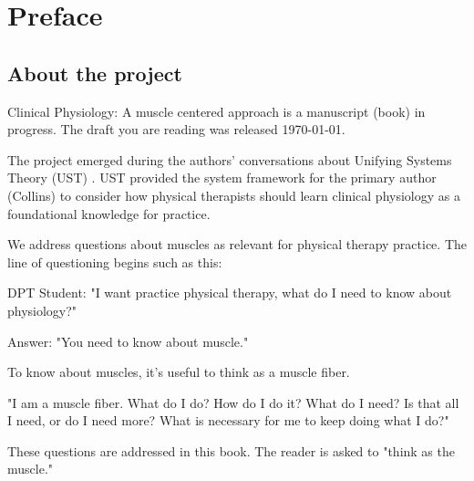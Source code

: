 \chapter*{Preface}

% 
\section*{About the project}
Clinical Physiology: A muscle centered approach is a manuscript (book) in progress. The draft you are reading was released \today.

The project emerged during the authors' conversations about Unifying Systems Theory (UST) \cite{kahlen_perception_2017}. UST provided the system framework for the primary author (Collins) to consider how physical therapists should learn clinical physiology as a foundational knowledge for practice. 

We address questions about muscles as relevant for physical therapy practice. The line of questioning begins such as this: 

\vspace{5mm}

\noindent DPT Student: "I want practice physical therapy, what do I need to know about physiology?" 

\vspace{5mm}

\noindent Answer: "You need to know about muscle." 

\vspace{5mm}

\noindent To know about muscles, it's useful to think as a muscle fiber. 
\vspace{5mm}

\noindent "I am a muscle fiber. What do I do? How do I do it? What do I need? Is that all I need, or do I need more? What is necessary for me to keep doing what I do?"

\vspace{5mm}

\noindent These questions are addressed in this book. The reader is asked to "think as the muscle."

